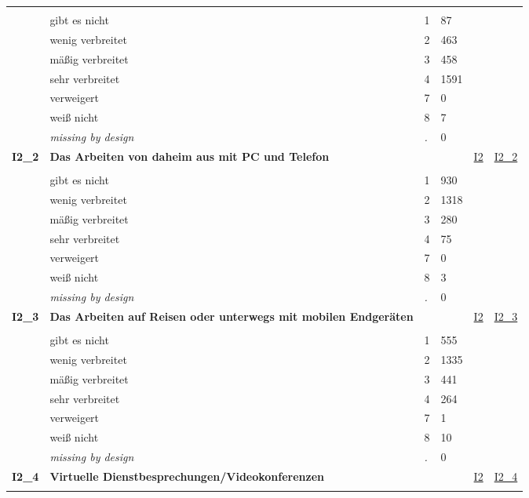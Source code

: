 \begin{longtable}{| L{2.45cm} | L{6cm} | C{1.5cm} | R{1cm} | C{2.25cm} | C{2.25cm} |}
   &  &  &  &  &  \\ 
   & gibt es nicht & 1 & 87 &  &  \\ 
   & wenig verbreitet & 2 & 463 &  &  \\ 
   & mäßig verbreitet & 3 & 458 &  &  \\ 
   & sehr verbreitet & 4 & 1591 &  &  \\ 
   & verweigert & 7 & 0 &  &  \\ 
   & weiß nicht & 8 & 7 &  &  \\ 
   & \textit{missing by design} & \textit{.} & 0 &  &  \\ 
   \midrule
\textbf{I2\_2}\label{var:I2:2} & \textbf{Das Arbeiten von daheim aus mit PC und Telefon} &  &  & \hyperref[I2]{I2} & \hyperref[var:suf:I2:2]{I2\_2} \\ 
   &  &  &  &  &  \\ 
   & gibt es nicht & 1 & 930 &  &  \\ 
   & wenig verbreitet & 2 & 1318 &  &  \\ 
   & mäßig verbreitet & 3 & 280 &  &  \\ 
   & sehr verbreitet & 4 & 75 &  &  \\ 
   & verweigert & 7 & 0 &  &  \\ 
   & weiß nicht & 8 & 3 &  &  \\ 
   & \textit{missing by design} & \textit{.} & 0 &  &  \\ 
   \midrule
\textbf{I2\_3}\label{var:I2:3} & \textbf{Das Arbeiten auf Reisen oder unterwegs mit mobilen Endgeräten} &  &  & \hyperref[I2]{I2} & \hyperref[var:suf:I2:3]{I2\_3} \\ 
   &  &  &  &  &  \\ 
   & gibt es nicht & 1 & 555 &  &  \\ 
   & wenig verbreitet & 2 & 1335 &  &  \\ 
   & mäßig verbreitet & 3 & 441 &  &  \\ 
   & sehr verbreitet & 4 & 264 &  &  \\ 
   & verweigert & 7 & 1 &  &  \\ 
   & weiß nicht & 8 & 10 &  &  \\ 
   & \textit{missing by design} & \textit{.} & 0 &  &  \\ 
   \midrule
\textbf{I2\_4}\label{var:I2:4} & \textbf{Virtuelle Dienstbesprechungen/Videokonferenzen} &  &  & \hyperref[I2]{I2} & \hyperref[var:suf:I2:4]{I2\_4} \\ 
   &  &  &  &  &  \\ 

\end{longtable}

